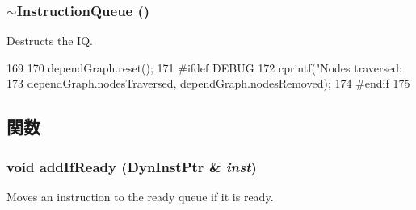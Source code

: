 \hypertarget{classInstructionQueue_a80656aa048fa902ea6e652373a9d4c58}{
\subsubsection[{$\sim$InstructionQueue}]{\setlength{\rightskip}{0pt plus 5cm}$\sim${\bf InstructionQueue} ()}}
\label{classInstructionQueue_a80656aa048fa902ea6e652373a9d4c58}
Destructs the IQ. 


\begin{DoxyCode}
169 {
170     dependGraph.reset();
171 #ifdef DEBUG
172     cprintf("Nodes traversed: %
173             dependGraph.nodesTraversed, dependGraph.nodesRemoved);
174 #endif
175 }
\end{DoxyCode}


\subsection{関数}
\hypertarget{classInstructionQueue_a7e3f1fa43ca939ed6fd9b3abcc47f06e}{
\subsubsection[{addIfReady}]{\setlength{\rightskip}{0pt plus 5cm}void addIfReady ({\bf DynInstPtr} \& {\em inst})}}
\label{classInstructionQueue_a7e3f1fa43ca939ed6fd9b3abcc47f06e}
Moves an instruction to the ready queue if it is ready. 


